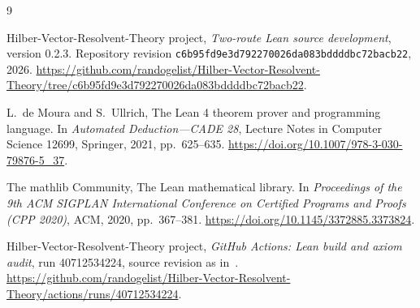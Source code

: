 \documentclass[11pt,a4paper]{article}
\theoremstyle{definition}
\numberwithin{equation}{section}
\newcommand{\code}[1]{\texttt{\small #1}}
\begin{document}
\begin{thebibliography}{9}\raggedright
{}
Hilber-Vector-Resolvent-Theory project,
\emph{Two-route Lean source development}, version 0.2.3.
Repository revision
\code{c6b95fd9e3d792270026da083bddddbc72bacb22}, 2026.
\url{https://github.com/randogelist/Hilber-Vector-Resolvent-Theory/tree/c6b95fd9e3d792270026da083bddddbc72bacb22}.

L.~de Moura and S.~Ullrich,
The Lean 4 theorem prover and programming language.
In \emph{Automated Deduction---CADE 28},
Lecture Notes in Computer Science 12699, Springer, 2021, pp.~625--635.
\url{https://doi.org/10.1007/978-3-030-79876-5_37}.

The mathlib Community,
The Lean mathematical library.
In \emph{Proceedings of the 9th ACM SIGPLAN International Conference on
Certified Programs and Proofs (CPP 2020)}, ACM, 2020, pp.~367--381.
\url{https://doi.org/10.1145/3372885.3373824}.

Hilber-Vector-Resolvent-Theory project,
\emph{GitHub Actions: Lean build and axiom audit},
run 40712534224, source revision as in~\cite{source}.
\url{https://github.com/randogelist/Hilber-Vector-Resolvent-Theory/actions/runs/40712534224}.
\end{thebibliography}
\end{document}
